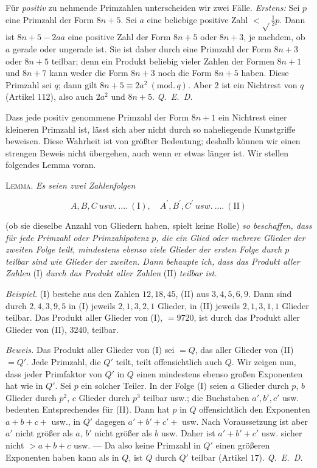 Für \textit{positiv} zu nehmende Primzahlen unterscheiden wir zwei Fälle. \textit{Erstens:} Sei $p$ eine Primzahl der Form $8n+5$. Sei $a$ eine beliebige positive Zahl $<\surd\!\frac12 p$. Dann ist $8n+5-2aa$ eine positive Zahl der Form $8n+5$ oder $8n+3$, je nachdem, ob $a$ gerade oder ungerade ist. Sie ist daher durch eine Primzahl der Form $8n+3$ oder $8n+5$ teilbar; denn ein Produkt beliebig vieler Zahlen der Formen $8n+1$ und $8n+7$ kann weder die Form $8n+3$ noch die Form $8n+5$ haben. Diese Primzahl sei $q$; dann gilt $8n+5\equiv2a^2\ (\mathrm{mod.}\,q)$. Aber $2$ ist ein Nichtrest von $q$ (Artikel $112$), also auch $2a^2$ und $8n+5$. \mbox{\textit{Q. E. D.}}

Dass jede positiv genommene Primzahl der Form $8n+1$ ein Nichtrest einer kleineren Primzahl ist, lässt sich aber nicht durch so naheliegende Kunstgriffe beweisen. Diese Wahrheit ist von größter Bedeutung; deshalb können wir einen strengen Beweis nicht übergehen, auch wenn er etwas länger ist. Wir stellen folgendes Lemma voran.

\textsc{Lemma.} \textit{Es seien zwei Zahlenfolgen}

\[
A,B,C\ \textit{usw.}\ ....\ (\mathrm{I}),\quad A^{\prime},B^{\prime},C^{\prime}\ \textit{usw.}\ ....\ (\mathrm{II})
\]

(ob sie dieselbe Anzahl von Gliedern haben, spielt keine Rolle) \textit{so beschaffen, dass für jede Primzahl oder Primzahlpotenz $p$, die ein Glied oder mehrere Glieder der zweiten Folge teilt, mindestens ebenso viele Glieder der ersten Folge durch $p$ teilbar sind wie Glieder der zweiten. Dann behaupte ich, dass das Produkt aller Zahlen} (I) \textit{durch das Produkt aller Zahlen} (II) \textit{teilbar ist.}

\textit{Beispiel.} (I) bestehe aus den Zahlen $12,18,45$, (II) aus $3,4,5,6,9$. Dann sind durch $2,4,3,9,5$ in (I) jeweils $2,1,3,2,1$ Glieder, in (II) jeweils $2,1,3,1,1$ Glieder teilbar. Das Produkt aller Glieder von (I), $=9720$, ist durch das Produkt aller Glieder von (II), $3240$, teilbar.

\textit{Beweis.} Das Produkt aller Glieder von (I) sei $=Q$, das aller Glieder von (II) $=Q'$. Jede Primzahl, die $Q'$ teilt, teilt offensichtlich auch $Q$. Wir zeigen nun, dass jeder Primfaktor von $Q'$ in $Q$ einen mindestens ebenso großen Exponenten hat wie in $Q'$. Sei $p$ ein solcher Teiler. In der Folge (I) seien $a$ Glieder durch $p$, $b$ Glieder durch $p^2$, $c$ Glieder durch $p^3$ teilbar usw.; die Buchstaben $a',b',c'$ usw. bedeuten Entsprechendes für (II). Dann hat $p$ in $Q$ offensichtlich den Exponenten $a+b+c+$ usw., in $Q'$ dagegen $a'+b'+c'+$ usw. Nach Voraussetzung ist aber $a'$ nicht größer als $a$, $b'$ nicht größer als $b$ usw. Daher ist $a'+b'+c'$ usw. sicher nicht $>a+b+c$ usw. --- Da also keine Primzahl in $Q'$ einen größeren Exponenten haben kann als in $Q$, ist $Q$ durch $Q'$ teilbar (Artikel $17$). \mbox{\textit{Q. E. D.}}


